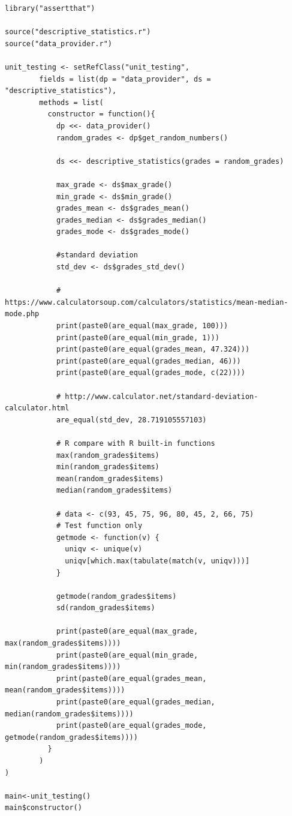 \documentclass[11pt]{article}
\begin{document}
\begin{lstlisting}
library("assertthat")

source("descriptive_statistics.r")
source("data_provider.r")

unit_testing <- setRefClass("unit_testing",
        fields = list(dp = "data_provider", ds = "descriptive_statistics"),
        methods = list(
          constructor = function(){
            dp <<- data_provider()
            random_grades <- dp$get_random_numbers()
            
            ds <<- descriptive_statistics(grades = random_grades)
            
            max_grade <- ds$max_grade()
            min_grade <- ds$min_grade()
            grades_mean <- ds$grades_mean()
            grades_median <- ds$grades_median()
            grades_mode <- ds$grades_mode()
            
            #standard deviation
            std_dev <- ds$grades_std_dev()
            
            # https://www.calculatorsoup.com/calculators/statistics/mean-median-mode.php
            print(paste0(are_equal(max_grade, 100)))
            print(paste0(are_equal(min_grade, 1)))
            print(paste0(are_equal(grades_mean, 47.324)))
            print(paste0(are_equal(grades_median, 46)))
            print(paste0(are_equal(grades_mode, c(22))))
            
            # http://www.calculator.net/standard-deviation-calculator.html
            are_equal(std_dev, 28.719105557103)
            
            # R compare with R built-in functions
            max(random_grades$items)
            min(random_grades$items)
            mean(random_grades$items)
            median(random_grades$items)
            
            # data <- c(93, 45, 75, 96, 80, 45, 2, 66, 75)
            # Test function only
            getmode <- function(v) {
              uniqv <- unique(v)
              uniqv[which.max(tabulate(match(v, uniqv)))]
            }
            
            getmode(random_grades$items)
            sd(random_grades$items)
            
            print(paste0(are_equal(max_grade, max(random_grades$items))))
            print(paste0(are_equal(min_grade, min(random_grades$items))))
            print(paste0(are_equal(grades_mean, mean(random_grades$items))))
            print(paste0(are_equal(grades_median, median(random_grades$items))))
            print(paste0(are_equal(grades_mode, getmode(random_grades$items))))
          }
        )
)

main<-unit_testing()
main$constructor()
\end{lstlisting}
\end{document}
